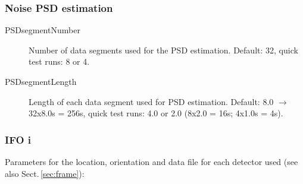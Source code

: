 \documentclass[10pt]{article}
\begin{document}
\subsubsection{Noise PSD estimation}
\begin{description}
\item[PSDsegmentNumber] Number of data segments used for the PSD estimation.  Default: 32, quick test runs: 8 or 4.
\item[PSDsegmentLength] Length of each data segment used for PSD estimation.  Default: 8.0 $\rightarrow$ 32x8.0s = 256s, quick test runs: 4.0 or 2.0 (8x2.0 = 16s; 4x1.0s = 4s).
\end{description}




\subsubsection{IFO i}
\label{sec:input.data.ifo}
Parameters for the location, orientation and data file for each detector used
(see also Sect.\,\ref{sec:frame}):
\end{document}
